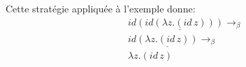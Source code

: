 Cette stratégie appliquée à l'exemple donne:
\begin{align*}
  & id \underline{(id (\lambda z . (id \, z)))} \rightarrow_{\beta}\\
  & id \underline{(\lambda z . (id \, z))} \rightarrow_{\beta} \\
  & \lambda z . (id \, z)
\end{align*}

\label{fig:untyped-lambda-calculus-evaluation-rules}

%





